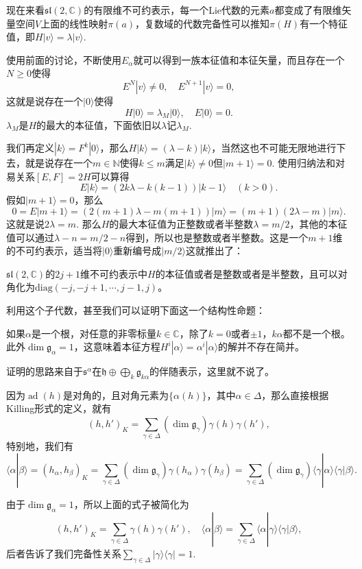 \documentclass[9pt]{extarticle}
\newcommand{\cc}{\mathbb{C}}
\newcommand{\lag}{{\mathfrak{g}}}
\DeclareMathOperator{\ad}{ad}
\begin{document}
\para 现在来看$\mathfrak{sl}(2,\cc)$的有限维不可约表示，每一个Lie代数的元素$a$都变成了有限维矢量空间$V$上面的线性映射$\pi(a)$，复数域的代数完备性可以推知$\pi(H)$有一个特征值，即$H|v\rangle=\lambda |v\rangle$.

使用前面的讨论，不断使用$E_\alpha$就可以得到一族本征值和本征矢量，而且存在一个$N\geq 0$使得
\[
	E^N|v\rangle\neq 0,\quad E^{N+1}|v\rangle =0,
\]
这就是说存在一个$|0\rangle$使得
\[
	H|0\rangle =\lambda_M |0\rangle,\quad E|0\rangle =0.
\]
$\lambda_M$是$H$的最大的本征值，下面依旧以$\lambda$记$\lambda_M$.

我们再定义$|k\rangle=F^k|0\rangle$，那么$H|k\rangle=(\lambda-k) |k\rangle$，当然这也不可能无限地进行下去，就是说存在一个$m\in \mathbb{N}$使得$k\leq m$满足$|k\rangle\neq 0$但$|m+1\rangle=0$. 使用归纳法和对易关系$[E,F]=2H$可以算得
\[
E|k\rangle=(2k\lambda -k(k-1)) |k-1\rangle\quad (k>0).
\]
假如$|m+1\rangle =0$，那么
\[
0=E|m+1\rangle=(2(m+1)\lambda -m(m+1)) |m\rangle =(m+1)(2\lambda-m)|m\rangle.
\]
这就是说$2\lambda=m$. 那么$H$的最大本征值为正整数或者半整数$\lambda=m/2$，其他的本征值可以通过$\lambda-n=m/2-n$得到，所以也是整数或者半整数。这是一个$m+1$维的不可约表示，适当将$|0\rangle$重新编号成$|m/2\rangle$这就推出了：

\pro $\mathfrak{sl}(2,\cc)$的$2j+1$维不可约表示中$H$的本征值或者是整数或者是半整数，且可以对角化为$\mathrm{diag}(-j,-j+1,\cdots,j-1,j)$。

利用这个子代数，甚至我们可以证明下面这一个结构性命题：

\pro 如果$\alpha$是一个根，对任意的非零标量$k\in \cc$，除了$k=0$或者$\pm 1$，$k\alpha$都不是一个根。此外$\dim \lag_{\alpha}=1$，这意味着本征方程$H^i|\alpha\rangle = \alpha^i|\alpha\rangle$的解并不存在简并。

证明的思路来自于$\mathfrak{s}^\alpha$在$\mathfrak{h} \oplus \bigoplus_k \lag_{k\alpha}$的伴随表示，这里就不说了。

\para 因为$\ad(h)$是对角的，且对角元素为$\{\alpha(h)\}$，其中$\alpha\in\Delta$，那么直接根据Killing形式的定义，就有
\[
	(h,h')_K=\sum_{\gamma \in \Delta}(\dim \lag_\gamma)\gamma(h)\gamma(h'),
\]
特别地，我们有
\[
	\langle \alpha|\beta \rangle=(h_\alpha,h_\beta)_K=\sum_{\gamma \in \Delta}(\dim \lag_\gamma)\gamma(h_\alpha)\gamma(h_\beta)=\sum_{\gamma \in \Delta}(\dim \lag_\gamma)\langle \gamma|\alpha\rangle\langle \gamma|\beta\rangle.
\]

由于$\dim \lag_{\alpha}=1$，所以上面的式子被简化为
\[
	(h,h')_K=\sum_{\gamma \in \Delta}\gamma(h)\gamma(h'),\quad \langle \alpha|\beta \rangle=\sum_{\gamma \in \Delta}\langle \alpha|\gamma\rangle\langle \gamma|\beta\rangle,
\]
后者告诉了我们完备性关系$\sum_{\gamma\in \Delta}|\gamma\rangle\langle \gamma|=1$.
\end{document}
